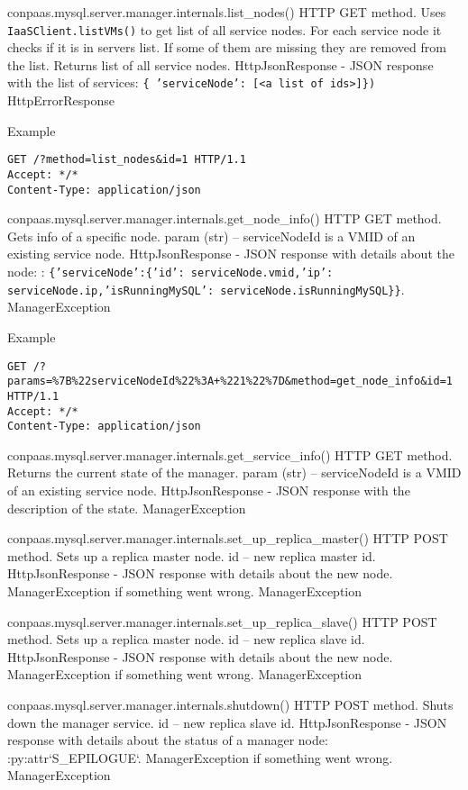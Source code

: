 \documentclass[a4paper,10pt]{article}
\begin{document}
\noindent\conapi
{ conpaas.mysql.server.manager.internals.list\_nodes()}
{ HTTP GET method. Uses {\tt IaaSClient.listVMs()} to get list of all service nodes. For each service node it checks if it is in servers list. If some of them are missing they are removed from the list. Returns list of all service nodes.}
{}
{HttpJsonResponse - JSON response with the list of services: {\tt \{ 'serviceNode': [<a list of ids>]\})}}
{HttpErrorResponse}

Example
\begin{verbatim}
GET /?method=list_nodes&id=1 HTTP/1.1
Accept: */*
Content-Type: application/json
\end{verbatim}

\noindent\conapi
{ conpaas.mysql.server.manager.internals.get\_node\_info()}
{HTTP GET method. Gets info of a specific node.}
{param (str) -- serviceNodeId is a VMID of an existing service node.}
{HttpJsonResponse - JSON response with details about the node: : {\tt \{'serviceNode':\{'id': serviceNode.vmid,'ip': serviceNode.ip,'isRunningMySQL': serviceNode.isRunningMySQL\}\}}.}
{ManagerException}

Example
\begin{verbatim}
GET /?params=%7B%22serviceNodeId%22%3A+%221%22%7D&method=get_node_info&id=1 HTTP/1.1
Accept: */*
Content-Type: application/json
\end{verbatim}

\noindent\conapi
{ conpaas.mysql.server.manager.internals.get\_service\_info()}
{HTTP GET method. Returns the current state of the manager.}
{param (str) -- serviceNodeId is a VMID of an existing service node.}
{HttpJsonResponse - JSON response with the description of the state.}
{ManagerException}

\noindent\conapi
{ conpaas.mysql.server.manager.internals.set\_up\_replica\_master()}
{HTTP POST method. Sets up a replica master node.}
{ id -- new replica master id.}
{HttpJsonResponse - JSON response with details about the new
      node. ManagerException if something went wrong.}
{ManagerException}
     
\noindent\conapi
{ conpaas.mysql.server.manager.internals.set\_up\_replica\_slave()}
{HTTP POST method. Sets up a replica master node.}
{  id -- new replica slave id.}
{ HttpJsonResponse - JSON response with details about the new
      node. ManagerException if something went wrong.}
{ManagerException}


\noindent\conapi
{ conpaas.mysql.server.manager.internals.shutdown()}
{HTTP POST method. Shuts down the manager service.}
{  id -- new replica slave id.}
{ HttpJsonResponse - JSON response with details about the status
      of a manager node: :py:attr`S\_EPILOGUE`. ManagerException if
      something went wrong.}
{ManagerException}
\end{document}
